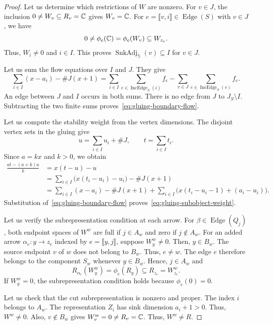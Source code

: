 \begin{proof}
 Let us determine which restrictions of $W$ are nonzero.
For $v\in J$, the inclusion $0\ne W_v\subseteq R_v=\mathbb C$ gives $W_v=\mathbb C$.
For $e=\llbracket v,i\rrbracket\in\operatorname{Edge}(S)$ with $v\in J$, we have
\[
 0\ne\phi_e(\mathbb C)=\phi_e(W_v)\subseteq W_{z_e}.
\]
Thus, $W_i\ne0$ and $i\in I$.
This proves $\operatorname{SnkAdj}_{\mathbb S}(v)\subseteq I$ for $v\in J$.

Let us sum the flow equations over $I$ and $J$.
They give
\[
 \sum_{i\in I}(x-a_i)-\#J(x+1)
 =
 \sum_{i\in I}\sum_{e\in\operatorname{IncEdge}_S(i)}f_e
 -
 \sum_{v\in J}\sum_{e\in\operatorname{IncEdge}_S(v)}f_e.
\]
An edge between $J$ and $I$ occurs in both sums.
There is no edge from $J$ to $J_S\setminus I$.
Subtracting the two finite sums proves~\eqref{eq:gluing-boundary-flow}.

Let us compute the stability weight from the vertex dimensions.
The disjoint vertex sets in the gluing give
\[
 u=\sum_{i\in I}u_i+\#J,\qquad t=\sum_{i\in I}t_i.
\]
Since $a=kx$ and $k>0$, we obtain
\[
\begin{aligned}
 \frac{at-(a+k)u}{k}
 &=x(t-u)-u\\
 &=\sum_{i\in I}\bigl(x(t_i-u_i)-u_i\bigr)-\#J(x+1)\\
 &=\sum_{i\in I}(x-a_i)-\#J(x+1)
   +\sum_{i\in I}\bigl(x(t_i-u_i-1)+(a_i-u_i)\bigr).
\end{aligned}
\]
Substitution of~\eqref{eq:gluing-boundary-flow} proves~\eqref{eq:gluing-subobject-weight}.

 Let us verify the subrepresentation condition at each arrow.
For $\beta\in\operatorname{Edge}(Q_j)$, both endpoint spaces of $W^w$ are full if $j\in A_w$ and zero if $j\notin A_w$.
For an added arrow $\alpha_e:y\to z_e$ indexed by $e=\llbracket y,j\rrbracket$, suppose $W^w_y\ne0$.
Then, $y\in B_w$.
The source endpoint $v$ of $w$ does not belong to $B_w$. Thus, $e\ne w$.
The edge $e$ therefore belongs to the component $S_w$ whenever $y\in B_w$.
Hence, $j\in A_w$ and
\[
 R_{\alpha_e}(W^w_y)=\phi_e(R_y)\subseteq R_{z_e}=W^w_{z_e}.
\]
If $W^w_y=0$, the subrepresentation condition holds because $\phi_e(0)=0$.

Let us check that the cut subrepresentation is nonzero and proper.
The index $i$ belongs to $A_w$. The representation $Z_i$ has sink dimension $a_i+1>0$.
Thus, $W^w\ne0$.
Also, $v\notin B_w$ gives $W^w_v=0\ne R_v=\mathbb C$. Thus, $W^w\ne R$.


\end{proof}
